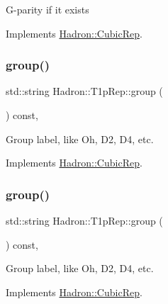 G-\/parity if it exists 

Implements \mbox{\hyperlink{structHadron_1_1CubicRep_a52104e43266d1614c00bbd1c3b395458}{Hadron\+::\+Cubic\+Rep}}.

\mbox{\label{structHadron_1_1T1pRep_aa4bc2345a21f69f38cca9a1049eb7be6}} 
\subsubsection{\texorpdfstring{group()}{group()}\hspace{0.1cm}{\footnotesize\ttfamily [1/2]}}
{\footnotesize\ttfamily std\+::string Hadron\+::\+T1p\+Rep\+::group (\begin{DoxyParamCaption}{ }\end{DoxyParamCaption}) const\hspace{0.3cm}{\ttfamily [inline]}, {\ttfamily [virtual]}}

Group label, like Oh, D2, D4, etc. 

Implements \mbox{\hyperlink{structHadron_1_1CubicRep_a0748f11ec87f387062c8e8981339a29c}{Hadron\+::\+Cubic\+Rep}}.

\mbox{\label{structHadron_1_1T1pRep_aa4bc2345a21f69f38cca9a1049eb7be6}} 
\subsubsection{\texorpdfstring{group()}{group()}\hspace{0.1cm}{\footnotesize\ttfamily [2/2]}}
{\footnotesize\ttfamily std\+::string Hadron\+::\+T1p\+Rep\+::group (\begin{DoxyParamCaption}{ }\end{DoxyParamCaption}) const\hspace{0.3cm}{\ttfamily [inline]}, {\ttfamily [virtual]}}

Group label, like Oh, D2, D4, etc. 

Implements \mbox{\hyperlink{structHadron_1_1CubicRep_a0748f11ec87f387062c8e8981339a29c}{Hadron\+::\+Cubic\+Rep}}.

\mbox{\label{structHadron_1_1T1pRep_a2cdc4017e6c5a92d190bc873e44361fe}} 
